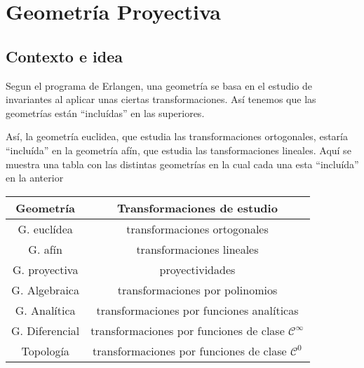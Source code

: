 \chapter{Geometría Proyectiva}
\section{Contexto e idea}
Segun el programa de Erlangen, una geometría se basa en el estudio de invariantes
al aplicar unas ciertas transformaciones. Así tenemos que las geometrías están
``incluídas'' en las superiores.

Así, la geometría euclidea, que estudia las transformaciones ortogonales, estaría
``incluída'' en la geometría afín, que estudia las tansformaciones lineales. Aquí
se muestra una tabla con las distintas geometrías en la cual cada una esta
``incluída'' en la anterior
\begin{center}
    \begin{tabular}{|c|c|}
        \hline Geometría & Transformaciones de estudio \\
        \hline \hline
        G. euclídea  & transformaciones ortogonales \\ \hline
        G. afín & transformaciones lineales \\ \hline
        G. proyectiva & proyectividades \\ \hline
        G. Algebraica & transformaciones por polinomios \\ \hline
        G. Analítica & transformaciones por funciones analíticas \\ \hline
        G. Diferencial & transformaciones por funciones de clase
        $\mathscr{C}^\infty$ \\ \hline
        Topología & transformaciones por funciones de clase $\mathscr{C}^0$\\ \hline
    \end{tabular}
\end{center}

